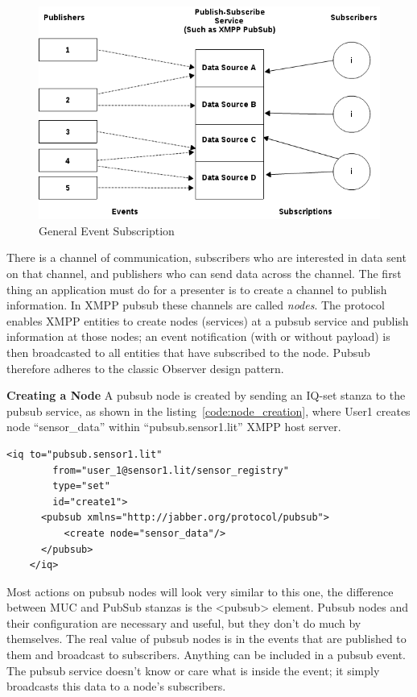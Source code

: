 \begin{figure}[!ht]
    \centering
    \includegraphics[scale=0.5]{images/XEP0049.png}   
    \caption[General Event Subscription]{General Event Subscription}  
    \label{img:basic-pubsub}                    
\end{figure}

There is a channel of communication, subscribers who are interested in data sent on that channel, and publishers who can send data across the channel. The first thing an application must do for a presenter is to create a channel to publish information. In XMPP pubsub these channels are called \emph{nodes}. The protocol enables XMPP entities to create nodes (services) at a pubsub service and publish information at those nodes; an event notification (with or without payload) is then broadcasted to all entities that have subscribed to the node. Pubsub therefore adheres to the classic Observer design pattern.

	\textbf{Creating a Node}
	\newline
	A pubsub node is created by sending an IQ-set stanza to the pubsub service, as shown in the listing~\ref{code:node_creation}, where User1 creates node ``sensor\_data'' within ``pubsub.sensor1.lit'' XMPP host server.
		\begin{lstlisting}[label=code:node_creation,caption=PubSub Node Creation]
	<iq to="pubsub.sensor1.lit"
	    from="user_1@sensor1.lit/sensor_registry"
	    type="set"
	    id="create1">
	  <pubsub xmlns="http://jabber.org/protocol/pubsub">
	      <create node="sensor_data"/>
	  </pubsub>
	</iq>
		\end{lstlisting}
	Most actions on pubsub nodes will look very similar to this one, the difference between MUC and PubSub stanzas is the <pubsub> element. Pubsub nodes and their configuration are necessary and useful, but they don't do much by themselves. The real value of pubsub nodes is in the events that are published to them and broadcast to subscribers. Anything can be included in a pubsub event. The pubsub service doesn’t know or care what is inside the event; it simply broadcasts this data to a node’s subscribers.

